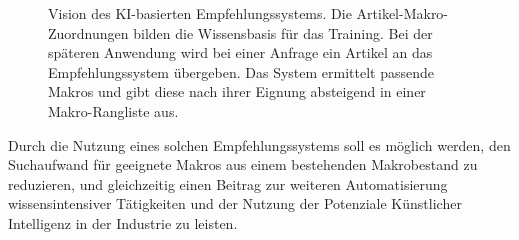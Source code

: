 \begin{figure}[H]
        \caption{ Vision des KI-basierten Empfehlungssystems. Die Artikel-Makro-Zuordnungen bilden die Wissensbasis für das Training. Bei der späteren Anwendung wird bei einer Anfrage ein Artikel an das Empfehlungssystem übergeben. Das System ermittelt passende Makros und gibt diese nach ihrer Eignung absteigend in einer Makro-Rangliste aus. } 
        \label{fig:vision} 
        \end{figure}


Durch die Nutzung eines solchen Empfehlungssystems soll es möglich werden, den Suchaufwand für geeignete Makros aus einem bestehenden Makrobestand zu reduzieren,
und gleichzeitig einen Beitrag zur weiteren Automatisierung wissensintensiver Tätigkeiten und der Nutzung der Potenziale Künstlicher Intelligenz in der Industrie zu leisten.



